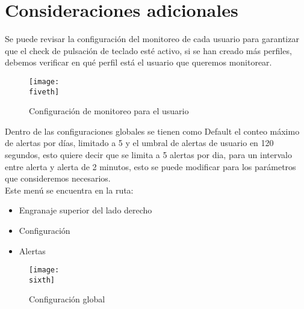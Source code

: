 \documentclass[a4paper]{article}
\newcommand{\fiveth}{img/captura5.png}
\newcommand{\sixth}{img/captura6.png}
\begin{document}
    \section{Consideraciones adicionales}
    Se puede revisar la configuración del monitoreo de cada usuario para garantizar que el check de pulsación de teclado esté activo, si se han creado más perfiles, debemos verificar en qué perfil está el usuario que queremos monitorear.

    \begin{figure}[H] 
        \centering 
        \texttt{[image: \\fiveth]} 
        \caption{Configuración de monitoreo para el usuario}
    \end{figure}

    Dentro de las configuraciones globales se tienen como Default el conteo máximo de alertas por días, limitado a 5 y el umbral de alertas de usuario en 120 segundos, esto quiere decir que se limita a 5 alertas por dia, para un intervalo entre alerta y alerta de 2 minutos, esto se puede modificar para los parámetros que consideremos necesarios.\\
    Este menú se encuentra en la ruta:

    \begin{itemize}
        \item Engranaje superior del lado derecho 
        \item Configuración
        \item Alertas
    \end{itemize}

    \begin{figure}[H] 
        \centering 
        \texttt{[image: \\sixth]} 
        \caption{Configuración global}
    \end{figure}
\end{document}
